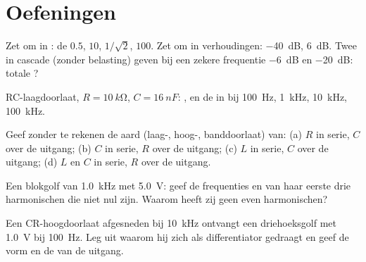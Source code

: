 \section{Oefeningen}

\begin{exercise}[$\star$]\label{exo:b1:filters-transfer-functions:1}
Zet om in : de  $0.5$, $10$, $1/\sqrt2$, $100$. Zet om in
verhoudingen: \qty{-40}{dB}, \qty{+6}{dB}. Twee  in cascade (zonder belasting)
geven bij een zekere frequentie \qty{-6}{dB} en \qty{-20}{dB}: totale ?
\end{exercise}

\begin{exercise}[$\star$]\label{exo:b1:filters-transfer-functions:2}
RC-laagdoorlaat, $R = \qty{10}{k\ohm}$, $C = \qty{16}{nF}$: ,
en de  in  bij \qty{100}{Hz}, \qty{1}{kHz}, \qty{10}{kHz},
\qty{100}{kHz}.
\end{exercise}

\begin{exercise}[$\star$]\label{exo:b1:filters-transfer-functions:3}
Geef zonder te rekenen de aard (laag-, hoog-, banddoorlaat) van: (a)
$R$ in serie, $C$ over de uitgang; (b) $C$ in serie, $R$ over de
uitgang; (c) $L$ in serie, $C$ over de uitgang; (d) $L$ en $C$ in
serie, $R$ over de uitgang.
\end{exercise}

\begin{exercise}[$\star$]\label{exo:b1:filters-transfer-functions:4}
Een blokgolf van \qty{1.0}{kHz} met  \qty{5.0}{V}: geef de
frequenties en  van haar eerste drie harmonischen die niet nul zijn. Waarom
heeft zij geen even harmonischen?
\end{exercise}

\begin{exercise}[$\star\star$]\label{exo:b1:filters-transfer-functions:5}
Een CR-hoogdoorlaat afgesneden bij \qty{10}{kHz} ontvangt een driehoeksgolf met
 \qty{1.0}{V} bij \qty{100}{Hz}. Leg uit waarom hij zich als
differentiator gedraagt en geef de vorm en de  van de uitgang.
\end{exercise}


